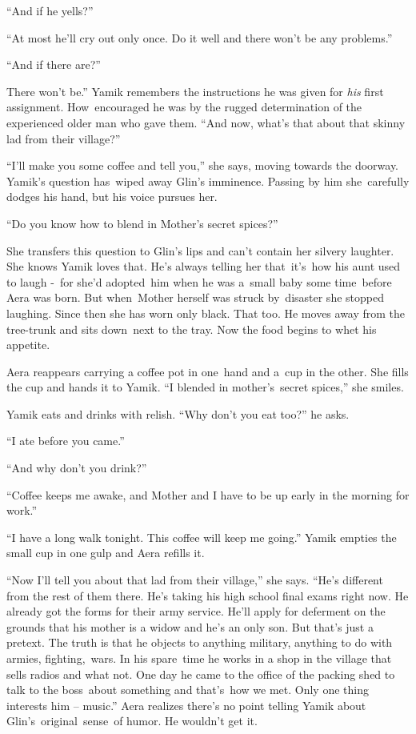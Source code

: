 \documentclass[letterpaper]{article}
\begin{document}
{}``And if he yells?'' 

{}``At most he'll cry out only once. Do it well and there won't be any problems.'' 

{}``And if there are?'' 

{\textquotedbl}There won't be.'' Yamik remembers the instructions he was given for \textit{his} first assignment.
How\ encouraged he was by the rugged determination of the experienced older man who gave them. ``And now, what's that
about that skinny lad from their village?'' 

{}``I'll make you some coffee and tell you,{}'' she says, moving towards the doorway. Yamik's question has~wiped away
Glin's \textcolor{black}{imminence}. Passing by him she\ carefully dodges his hand, but his voice pursues her.\ 

{}``Do you know how to blend in Mother's secret spices?'' 

She transfers this question to Glin's lips and can't contain her silvery laughter. She knows Yamik loves that. He{}'s
always telling her that\ it's\ how his aunt used to laugh -\  for she{}'d adopted\ him when he was a\ small baby some
time\ before Aera was born. But when\ Mother herself was struck by\ disaster she stopped laughing. Since then she has
worn only black. That too. He moves away from the tree-trunk and sits down\ next to the tray. Now the food begins to
whet his appetite.\ 

Aera reappears carrying a coffee pot in one~hand and a~cup in the other. She fills the cup and hands it to Yamik. ``I
blended in mother's~secret spices,'' she smiles.~ 

Yamik eats and drinks with relish. ``Why don't you eat too?'' he asks. 

{}``I ate before you came.'' 

{}``And why don't you drink?'' 

{}``Coffee keeps me awake, and Mother and I have to be up early in the morning for work.'' 

{}``I have a long walk tonight. This coffee will keep me going.'' Yamik empties the small cup in one gulp and Aera
refills it. 

{}``Now I'll tell you about that lad from their village,'' she says. {}``He's different from the rest of them there.
He{}'s taking his high school final exams right now. He already got the forms for their army service. He'll apply for
deferment on the grounds that his mother is a widow and he's an only son. But that's just a pretext. The truth is that
he objects to anything military, anything to do with armies, fighting,~wars. In his spare\ time he works in a shop in
the village that sells radios and what not. One day he came to the office of the packing shed to talk to the
boss\ about something and that's~how we met. Only one thing interests him -- music.'' Aera realizes there's no point
telling Yamik about Glin's\ original\textcolor{red}{\ }sense\ of humor. He wouldn't get it. 
\end{document}
